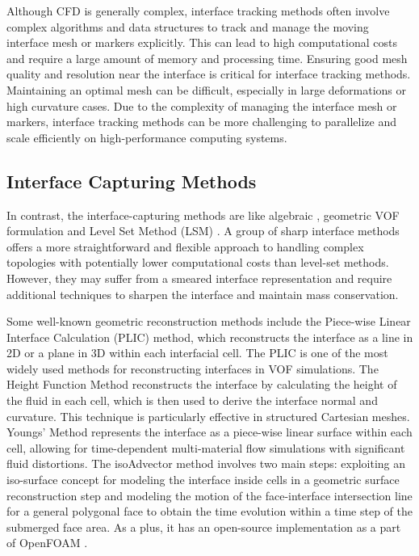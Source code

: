 Although \ac{CFD} is generally complex, interface tracking methods often involve complex algorithms and data structures to track and manage the moving interface mesh or markers explicitly. This can lead to high computational costs and require a large amount of memory and processing time.
Ensuring good mesh quality and resolution near the interface is critical for interface tracking methods. Maintaining an optimal mesh can be difficult, especially in large deformations or high curvature cases. Due to the complexity of managing the interface mesh or markers, interface tracking methods can be more challenging to parallelize and scale efficiently on high-performance computing systems.

\subsection{Interface Capturing Methods}

In contrast, the interface-capturing methods are like algebraic \cite{algebraicVOF}, geometric VOF \cite{roenby2019isoadvector} formulation and Level Set Method (\ac{LSM}) \cite{VOF_level_set}. A group of sharp interface methods \cite{sharp-interface} offers a more straightforward and flexible approach to handling complex topologies with potentially lower computational costs than level-set methods. However, they may suffer from a smeared interface representation and require additional techniques to sharpen the interface and maintain mass conservation.

Some well-known geometric reconstruction methods include the Piece-wise Linear Interface Calculation (\ac{PLIC}) \cite{huang2012piecewise} method, which reconstructs the interface as a line in 2D or a plane in 3D within each interfacial cell. The PLIC is one of the most widely used methods for reconstructing interfaces in VOF simulations. The Height Function Method \cite{height-function} reconstructs the interface by calculating the height of the fluid in each cell, which is then used to derive the interface normal and curvature. This technique is particularly effective in structured Cartesian meshes. Youngs' Method \cite{youngs-method} represents the interface as a piece-wise linear surface within each cell, allowing for time-dependent multi-material flow simulations with significant fluid distortions. The isoAdvector \cite{roenby2019isoadvector} method involves two main steps: exploiting an iso-surface concept for modeling the interface inside cells in a geometric surface reconstruction step and modeling the motion of the face-interface intersection line for a general polygonal face to obtain the time evolution within a time step of the submerged face area. As a plus, it has an open-source implementation as a part of OpenFOAM \cite{jasak2007openfoam}.

